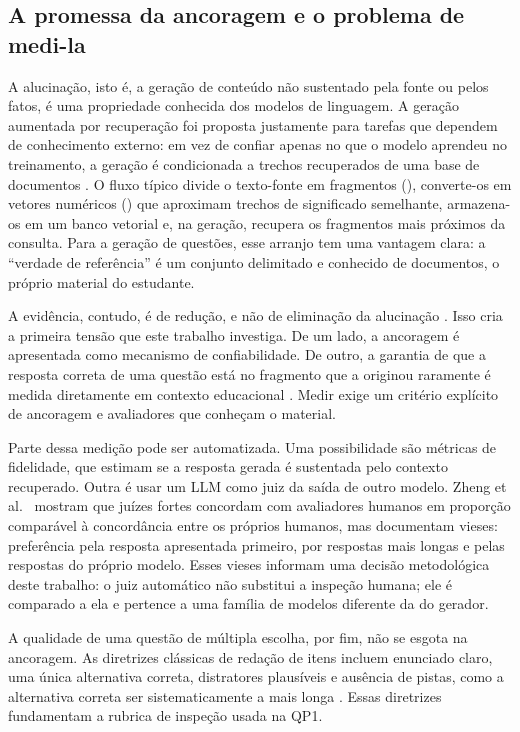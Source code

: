\subsection{A promessa da ancoragem e o problema de medi-la}

A alucinação, isto é, a geração de conteúdo não sustentado pela fonte ou pelos fatos, é uma propriedade conhecida dos modelos de linguagem. A geração aumentada por recuperação foi proposta justamente para tarefas que dependem de conhecimento externo: em vez de confiar apenas no que o modelo aprendeu no treinamento, a geração é condicionada a trechos recuperados de uma base de documentos \cite{LPP20}. O fluxo típico divide o texto-fonte em fragmentos (), converte-os em vetores numéricos () que aproximam trechos de significado semelhante, armazena-os em um banco vetorial e, na geração, recupera os fragmentos mais próximos da consulta. Para a geração de questões, esse arranjo tem uma vantagem clara: a ``verdade de referência'' é um conjunto delimitado e conhecido de documentos, o próprio material do estudante.

A evidência, contudo, é de redução, e não de eliminação da alucinação \cite{SPC21}. Isso cria a primeira tensão que este trabalho investiga. De um lado, a ancoragem é apresentada como mecanismo de confiabilidade. De outro, a garantia de que a resposta correta de uma questão está no fragmento que a originou raramente é medida diretamente em contexto educacional . Medir exige um critério explícito de ancoragem e avaliadores que conheçam o material.

Parte dessa medição pode ser automatizada. Uma possibilidade são métricas de fidelidade, que estimam se a resposta gerada é sustentada pelo contexto recuperado. Outra é usar um LLM como juiz da saída de outro modelo. Zheng et al.\ \cite{ZCS23} mostram que juízes fortes concordam com avaliadores humanos em proporção comparável à concordância entre os próprios humanos, mas documentam vieses: preferência pela resposta apresentada primeiro, por respostas mais longas e pelas respostas do próprio modelo. Esses vieses informam uma decisão metodológica deste trabalho: o juiz automático não substitui a inspeção humana; ele é comparado a ela e pertence a uma família de modelos diferente da do gerador.

A qualidade de uma questão de múltipla escolha, por fim, não se esgota na ancoragem. As diretrizes clássicas de redação de itens incluem enunciado claro, uma única alternativa correta, distratores plausíveis e ausência de pistas, como a alternativa correta ser sistematicamente a mais longa \cite{HDR02}. Essas diretrizes fundamentam a rubrica de inspeção usada na QP1.

